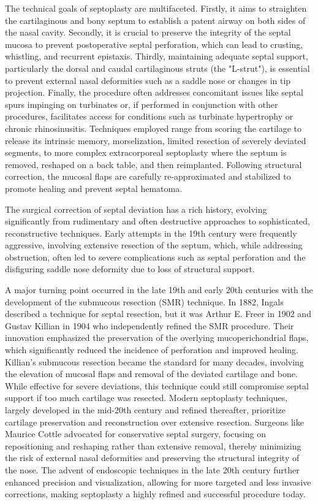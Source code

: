 The technical goals of septoplasty are multifaceted. Firstly, it aims to straighten the cartilaginous and bony septum to establish a patent airway on both sides of the nasal cavity. Secondly, it is crucial to preserve the integrity of the septal mucosa to prevent postoperative septal perforation, which can lead to crusting, whistling, and recurrent epistaxis. Thirdly, maintaining adequate septal support, particularly the dorsal and caudal cartilaginous struts (the "L-strut"), is essential to prevent external nasal deformities such as a saddle nose or changes in tip projection. Finally, the procedure often addresses concomitant issues like septal spurs impinging on turbinates or, if performed in conjunction with other procedures, facilitates access for conditions such as turbinate hypertrophy or chronic rhinosinusitis. Techniques employed range from scoring the cartilage to release its intrinsic memory, morselization, limited resection of severely deviated segments, to more complex extracorporeal septoplasty where the septum is removed, reshaped on a back table, and then reimplanted. Following structural correction, the mucosal flaps are carefully re-approximated and stabilized to promote healing and prevent septal hematoma.

The surgical correction of septal deviation has a rich history, evolving significantly from rudimentary and often destructive approaches to sophisticated, reconstructive techniques. Early attempts in the 19th century were frequently aggressive, involving extensive resection of the septum, which, while addressing obstruction, often led to severe complications such as septal perforation and the disfiguring saddle nose deformity due to loss of structural support.

A major turning point occurred in the late 19th and early 20th centuries with the development of the submucous resection (SMR) technique. In 1882, Ingals described a technique for septal resection, but it was Arthur E. Freer in 1902 and Gustav Killian in 1904 who independently refined the SMR procedure. Their innovation emphasized the preservation of the overlying mucoperichondrial flaps, which significantly reduced the incidence of perforation and improved healing. Killian's submucous resection became the standard for many decades, involving the elevation of mucosal flaps and removal of the deviated cartilage and bone. While effective for severe deviations, this technique could still compromise septal support if too much cartilage was resected. Modern septoplasty techniques, largely developed in the mid-20th century and refined thereafter, prioritize cartilage preservation and reconstruction over extensive resection. Surgeons like Maurice Cottle advocated for conservative septal surgery, focusing on repositioning and reshaping rather than extensive removal, thereby minimizing the risk of external nasal deformities and preserving the structural integrity of the nose. The advent of endoscopic techniques in the late 20th century further enhanced precision and visualization, allowing for more targeted and less invasive corrections, making septoplasty a highly refined and successful procedure today.

